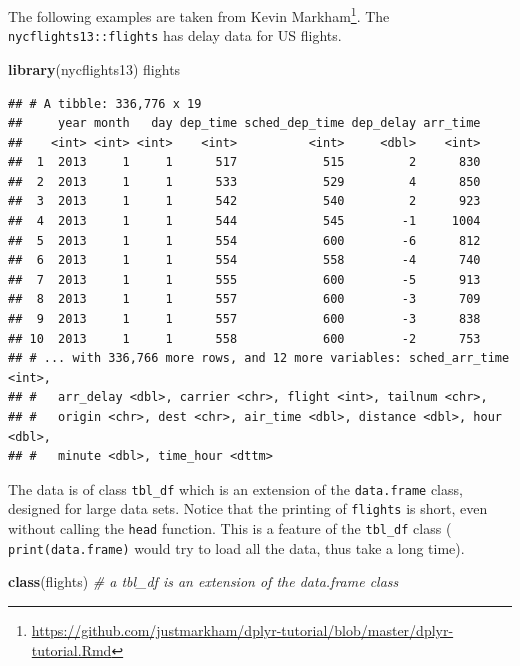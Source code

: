\documentclass[]{book}
\newenvironment{Shaded}{\begin{snugshade}}{\end{snugshade}}
\newcommand{\CommentTok}[1]{\textcolor[rgb]{0.56,0.35,0.01}{\textit{#1}}}
\newcommand{\KeywordTok}[1]{\textcolor[rgb]{0.13,0.29,0.53}{\textbf{#1}}}
\newcommand{\NormalTok}[1]{#1}
\renewcommand{\href}[2]{#2\footnote{\url{#1}}}
\theoremstyle{definition}
\theoremstyle{definition}
\theoremstyle{definition}
\theoremstyle{remark}
\begin{document}
The following examples are taken from \href{https://github.com/justmarkham/dplyr-tutorial/blob/master/dplyr-tutorial.Rmd}{Kevin Markham}.
The \texttt{nycflights13::flights} has delay data for US flights.

\begin{Shaded}
\begin{Highlighting}[]
\KeywordTok{library}\NormalTok{(nycflights13)}
\NormalTok{flights}
\end{Highlighting}
\end{Shaded}

\begin{verbatim}
## # A tibble: 336,776 x 19
##     year month   day dep_time sched_dep_time dep_delay arr_time
##    <int> <int> <int>    <int>          <int>     <dbl>    <int>
##  1  2013     1     1      517            515         2      830
##  2  2013     1     1      533            529         4      850
##  3  2013     1     1      542            540         2      923
##  4  2013     1     1      544            545        -1     1004
##  5  2013     1     1      554            600        -6      812
##  6  2013     1     1      554            558        -4      740
##  7  2013     1     1      555            600        -5      913
##  8  2013     1     1      557            600        -3      709
##  9  2013     1     1      557            600        -3      838
## 10  2013     1     1      558            600        -2      753
## # ... with 336,766 more rows, and 12 more variables: sched_arr_time <int>,
## #   arr_delay <dbl>, carrier <chr>, flight <int>, tailnum <chr>,
## #   origin <chr>, dest <chr>, air_time <dbl>, distance <dbl>, hour <dbl>,
## #   minute <dbl>, time_hour <dttm>
\end{verbatim}

The data is of class \texttt{tbl\_df} which is an extension of the \texttt{data.frame} class, designed for large data sets.
Notice that the printing of \texttt{flights} is short, even without calling the \texttt{head} function. This is a feature of the \texttt{tbl\_df} class ( \texttt{print(data.frame)} would try to load all the data, thus take a long time).

\begin{Shaded}
\begin{Highlighting}[]
\KeywordTok{class}\NormalTok{(flights) }\CommentTok{# a tbl_df is an extension of the data.frame class}
\end{Highlighting}
\end{Shaded}
\end{document}
